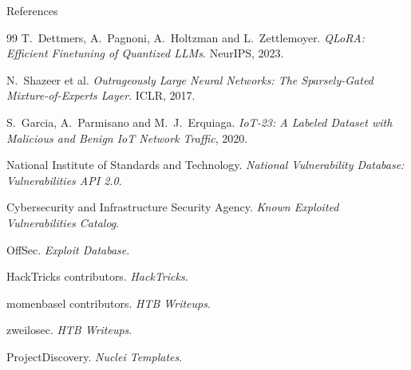 \documentclass[aspectratio=169,10pt]{beamer}
\begin{document}
\begin{frame}[allowframebreaks]{References}
  \scriptsize
  \begin{thebibliography}{99}
      T.~Dettmers, A.~Pagnoni, A.~Holtzman and L.~Zettlemoyer.
      \newblock \emph{QLoRA: Efficient Finetuning of Quantized LLMs}.
      \newblock NeurIPS, 2023.

      N.~Shazeer et al.
      \newblock \emph{Outrageously Large Neural Networks: The Sparsely-Gated
      Mixture-of-Experts Layer}.
      \newblock ICLR, 2017.

      S.~Garcia, A.~Parmisano and M.~J.~Erquiaga.
      \newblock \emph{IoT-23: A Labeled Dataset with Malicious and Benign IoT
      Network Traffic}, 2020.

      National Institute of Standards and Technology.
      \newblock \emph{National Vulnerability Database: Vulnerabilities API 2.0}.

      Cybersecurity and Infrastructure Security Agency.
      \newblock \emph{Known Exploited Vulnerabilities Catalog}.

      OffSec.
      \newblock \emph{Exploit Database}.

      HackTricks contributors.
      \newblock \emph{HackTricks}.

      momenbasel contributors.
      \newblock \emph{HTB Writeups}.

      zweilosec.
      \newblock \emph{HTB Writeups}.

      ProjectDiscovery.
      \newblock \emph{Nuclei Templates}.
  \end{thebibliography}
\end{frame}
\end{document}
